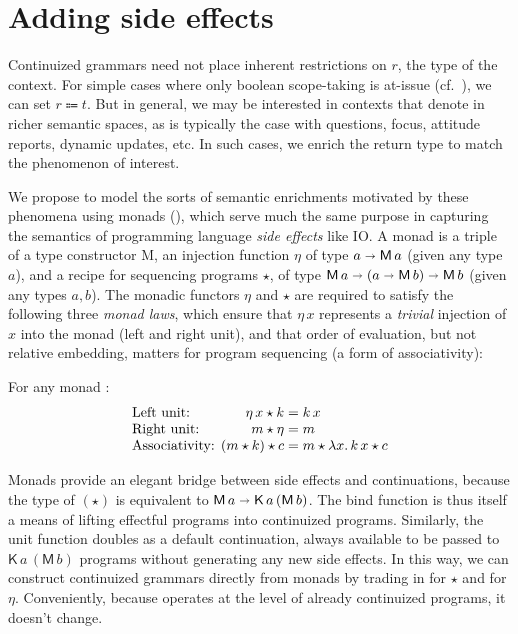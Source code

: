 
\section{Adding side effects}
  Continuized grammars need not place inherent restrictions on $r$, the type of the context. For simple cases where only boolean scope-taking is at-issue (cf.~\citealt{BarwiseCooper:1981}), we can set $r \Coloneqq t$. But in general, we may be interested in contexts that denote in richer semantic spaces, as is typically the case with questions, focus, attitude reports, dynamic updates, etc. In such cases, we enrich the return type to match the phenomenon of interest. %

  We propose to model the sorts of semantic enrichments motivated by these phenomena using monads (\citealt{Wadler:1994, Liangetal}), which serve much the same purpose in capturing the semantics of programming language \emph{side effects} like IO\@. A monad is a triple  of a type constructor \textsf{M}, an injection function $\eta$ of type $a \shortrightarrow \textsf{M}\,a$ (given any type $a$), and a recipe for sequencing programs $\star$, of type $\textsf{M}\,a \shortrightarrow (a \shortrightarrow \textsf{M}\,b) \shortrightarrow \textsf{M}\,b$ (given any types $a,b$). The monadic functors $\eta$ and $\star$ are required to satisfy the following three \emph{monad laws}, which ensure that $\eta\,x$ represents a \emph{trivial} injection of $x$ into the monad (left and right unit), and that order of evaluation, but not relative embedding, matters for program sequencing (a form of associativity): %
	\begin{defi}%
		For any monad :
		\[\begin{array}{l@{}r@{}l}
			\text{Left unit: }&\eta\,x \star k &{}= k\,x
			\\
			\text{Right unit: }&m \star \eta &{}= m
			\\
			\text{Associativity: }&(m \star k) \star c &{}= m \star \lambda x.\,k\,x \star c%
		\end{array}\]
	\end{defi}
	
  Monads provide an elegant bridge between side effects and continuations, because the type of $(\star)$ is equivalent to $\textsf{M}\,a \shortrightarrow \textsf{K}\,a\,(\textsf{M}\,b)$. The bind function is thus itself a means of lifting effectful programs into continuized programs. Similarly, the unit function doubles as a default continuation, always available to be passed to $\textsf{K}\,a\,(\textsf{M}\,b)$ programs without generating any new side effects. In this way, we can construct continuized grammars directly from monads by trading in  for $\star$ and  for $\eta$. Conveniently, because  operates at the level of already continuized programs, it doesn't change.%
	
